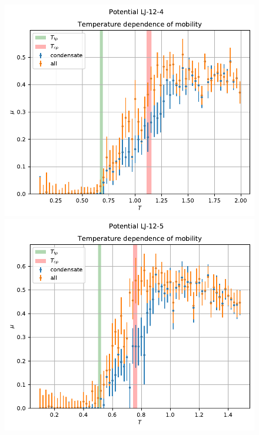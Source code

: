 \documentclass[pdf,hyperref={unicode}]{beamer}
\begin{document}
\begin{frame}
\transdissolve[duration=0.2]

\begin{figure}[h]
\begin{center}
\begin{minipage}[h]{0.35\linewidth}
\includegraphics[width=\textwidth, keepaspectratio]{plot_mobility_Potential LJ-12-4_1}
\end{minipage}
\begin{minipage}[h]{0.35\linewidth}
\includegraphics[width=\textwidth, keepaspectratio]{plot_mobility_Potential LJ-12-5_1}

\end{minipage}
\end{center}
\end{figure}
\end{frame}
\end{document}
